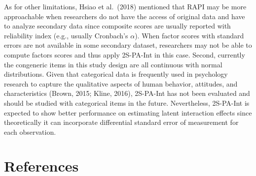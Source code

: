 \documentclass[
  man]{apa6}
\begin{document}
As for other limitations, Hsiao et al.~(2018) mentioned that RAPI may be more approachable when researchers do not have the access of original data and have to analyze secondary data since composite scores are usually reported with reliability index (e.g., usually Cronbach's \(\alpha\)). When factor scores with standard errors are not available in some secondary dataset, researchers may not be able to compute factors scores and thus apply 2S-PA-Int in this case. Second, currently the congeneric items in this study design are all continuous with normal distributions. Given that categorical data is frequently used in psychology research to capture the qualitative aspects of human behavior, attitudes, and characteristics (Brown, 2015; Kline, 2016), 2S-PA-Int has not been evaluated and should be studied with categorical items in the future. Nevertheless, 2S-PA-Int is expected to show better performance on estimating latent interaction effects since theoretically it can incorporate differential standard error of measurement for each observation.

\newpage

\section{References}\label{references}
\end{document}
